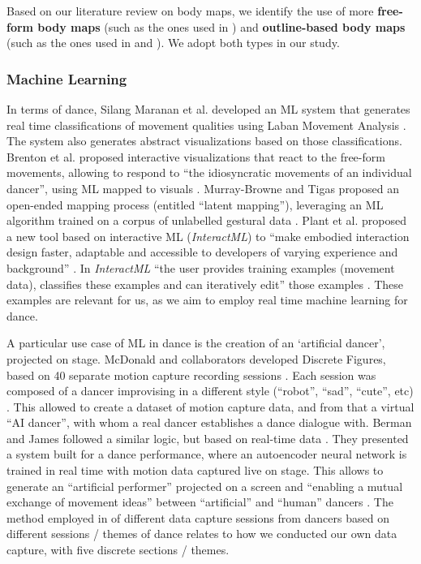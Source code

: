 Based on our literature review on body maps, we identify the use of more \textbf{free-form body maps} (such as the ones used in \cite{gastaldo_body-map_2012}) and \textbf{outline-based body maps} (such as the ones used in \cite{windlin_soma_2019} and \cite{nummenmaa_bodily_2014}). We adopt both types in our study.

\subsubsection{Machine Learning}

In terms of dance, Silang Maranan et al. developed an ML system that generates real time classifications of movement qualities using Laban Movement Analysis \cite{silang_maranan_designing_2014}. The system also generates abstract visualizations based on those classifications. Brenton et al. proposed interactive visualizations that react to the free-form movements, allowing to respond to “the idiosyncratic movements of an individual dancer”, using ML mapped to visuals \cite{brenton_embodied_2014}. Murray-Browne and Tigas proposed an open-ended mapping process (entitled “latent mapping”), leveraging an ML algorithm trained on a corpus of unlabelled gestural data \cite{murray-browne_latent_2021}. Plant et al. proposed a new tool based on interactive ML (\textit{InteractML}) to “make embodied interaction design faster, adaptable and accessible to developers of varying experience and background” \cite{plant_movement_2020}. In \textit{InteractML} “the user provides training examples (movement data), classifies these examples and can iteratively edit” those examples \cite{plant_movement_2020}. These examples are relevant for us, as we aim to employ real time machine learning for dance.

A particular use case of ML in dance is the creation of an ‘artificial dancer’, projected on stage. McDonald and collaborators developed Discrete Figures, based on 40 separate motion capture recording sessions \cite{mcdonald_dance_2018}. Each session was composed of a dancer improvising in a different style (“robot”, “sad”, “cute”, etc) \cite{mcdonald_dance_2018}. This allowed to create a dataset of motion capture data, and from that a virtual “AI dancer”, with whom a real dancer establishes a dance dialogue with. Berman and James followed a similar logic, but based on real-time data \cite{liapis_learning_2018}. They presented a system built for a dance performance, where an autoencoder neural network is trained in real time with motion data captured live on stage. This allows to generate an “artificial performer” projected on a screen and “enabling a mutual exchange of movement ideas” between “artificial” and “human” dancers \cite{liapis_learning_2018}. The method employed in \cite{mcdonald_dance_2018} of different data capture sessions from dancers based on different sessions / themes of dance relates to how we conducted our own data capture, with five discrete sections / themes.

